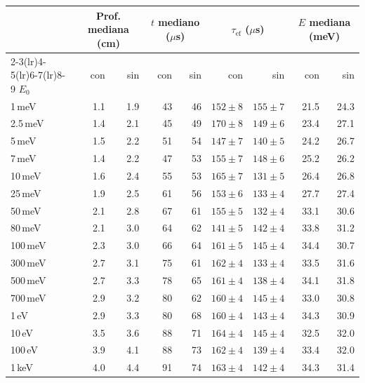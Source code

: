 \begin{tabular}{lrrrrrrrr}
\toprule
& \multicolumn{2}{c}{Prof. mediana (cm)} & \multicolumn{2}{c}{$t$ mediano ($\mu$s)} & \multicolumn{2}{c}{$\tau_\mathrm{ef}$ ($\mu$s)} & \multicolumn{2}{c}{$E$ mediana (meV)} \\
\cmidrule(lr){2-3}\cmidrule(lr){4-5}\cmidrule(lr){6-7}\cmidrule(lr){8-9}
$E_0$ & con & sin & con & sin & con & sin & con & sin \\
\midrule
1\,meV & 1.1 & 1.9 & 43 & 46 & $152\pm8$ & $155\pm7$ & 21.5 & 24.3 \\
2.5\,meV & 1.4 & 2.1 & 45 & 49 & $170\pm8$ & $149\pm6$ & 23.4 & 27.1 \\
5\,meV & 1.5 & 2.2 & 51 & 54 & $147\pm7$ & $140\pm5$ & 24.2 & 26.7 \\
7\,meV & 1.4 & 2.2 & 47 & 53 & $155\pm7$ & $148\pm6$ & 25.2 & 26.2 \\
10\,meV & 1.6 & 2.4 & 55 & 53 & $165\pm7$ & $131\pm5$ & 26.4 & 26.8 \\
25\,meV & 1.9 & 2.5 & 61 & 56 & $153\pm6$ & $133\pm4$ & 27.7 & 27.4 \\
50\,meV & 2.1 & 2.8 & 67 & 61 & $155\pm5$ & $132\pm4$ & 33.1 & 30.6 \\
80\,meV & 2.1 & 3.0 & 64 & 62 & $141\pm5$ & $142\pm4$ & 33.8 & 31.2 \\
100\,meV & 2.3 & 3.0 & 66 & 64 & $161\pm5$ & $145\pm4$ & 34.4 & 30.7 \\
300\,meV & 2.7 & 3.1 & 75 & 61 & $162\pm4$ & $133\pm4$ & 33.5 & 31.6 \\
500\,meV & 2.7 & 3.3 & 78 & 65 & $161\pm4$ & $138\pm4$ & 34.1 & 31.8 \\
700\,meV & 2.9 & 3.2 & 80 & 62 & $160\pm4$ & $145\pm4$ & 33.0 & 30.8 \\
1\,eV & 2.9 & 3.3 & 80 & 68 & $160\pm4$ & $143\pm4$ & 34.3 & 30.9 \\
10\,eV & 3.5 & 3.6 & 88 & 71 & $164\pm4$ & $145\pm4$ & 32.5 & 32.0 \\
100\,eV & 3.9 & 4.1 & 88 & 73 & $162\pm4$ & $139\pm4$ & 33.4 & 32.0 \\
1\,keV & 4.0 & 4.4 & 91 & 74 & $163\pm4$ & $142\pm4$ & 34.3 & 31.4 \\
\bottomrule
\end{tabular}
